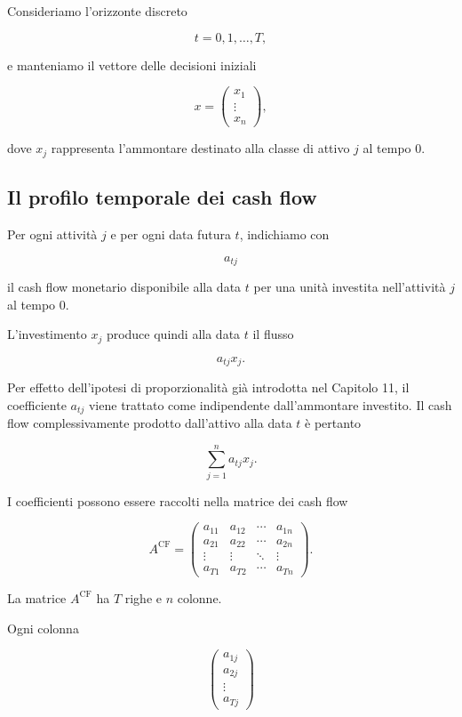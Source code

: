 Consideriamo l'orizzonte discreto

\[
t=0,1,\ldots,T,
\]

\noindent e manteniamo il vettore delle decisioni iniziali

\[
x=
\begin{pmatrix}
x_1\\
\vdots\\
x_n
\end{pmatrix},
\]

\noindent dove $x_j$ rappresenta l'ammontare destinato alla classe di attivo $j$ al
tempo $0$.

\subsection{Il profilo temporale dei cash flow}

Per ogni attivit\`a $j$ e per ogni data futura $t$, indichiamo con

\[
a_{tj}
\]

\noindent il cash flow monetario disponibile alla data $t$ per una unit\`a investita
nell'attivit\`a $j$ al tempo $0$.

L'investimento $x_j$ produce quindi alla data $t$ il flusso

\[
a_{tj}x_j.
\]

Per effetto dell'ipotesi di proporzionalit\`a gi\`a introdotta nel
Capitolo 11, il coefficiente $a_{tj}$ viene trattato come indipendente
dall'ammontare investito. Il cash flow complessivamente prodotto dall'attivo
alla data $t$ \`e pertanto

\[
\sum_{j=1}^{n}a_{tj}x_j.
\]

I coefficienti possono essere raccolti nella matrice dei cash flow

\[
A^{\mathrm{CF}}
=
\begin{pmatrix}
a_{11} & a_{12} & \cdots & a_{1n}\\
a_{21} & a_{22} & \cdots & a_{2n}\\
\vdots & \vdots & \ddots & \vdots\\
a_{T1} & a_{T2} & \cdots & a_{Tn}
\end{pmatrix}.
\]

La matrice $A^{\mathrm{CF}}$ ha $T$ righe e $n$ colonne.

Ogni colonna

\[
\begin{pmatrix}
a_{1j}\\
a_{2j}\\
\vdots\\
a_{Tj}
\end{pmatrix}
\]

